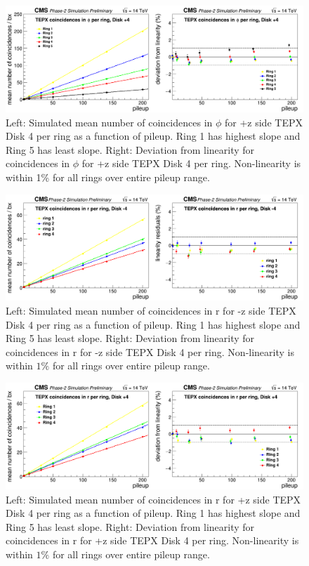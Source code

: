 \begin{figure}[H]
  \centering
  \includegraphics[width=1\columnwidth]{./coincidencesinphiperringD+4.png}
  \caption{Left: Simulated mean number of coincidences in $\phi$ for +z side TEPX Disk 4 per ring as a function of pileup. Ring 1 has highest slope and Ring 5 has least slope. Right: Deviation from linearity for coincidences in $\phi$ for +z side TEPX Disk 4 per ring. Non-linearity is within 1\% for all rings over entire pileup range.}
  \label{fig:CMS}
\end{figure}


\begin{figure}[H]
  \centering
  \includegraphics[width=1\columnwidth]{./coincidencesinrperringD-4.png}
  \caption{Left: Simulated mean number of coincidences in r for -z side TEPX Disk 4 per ring as a function of pileup. Ring 1 has highest slope and Ring 5 has least slope. Right: Deviation from linearity for coincidences in r for -z side TEPX Disk 4 per ring. Non-linearity is within $1\%$ for all rings over entire pileup range.}
  \label{fig:CMS}
\end{figure}


\begin{figure}[H]
  \centering
  \includegraphics[width=1\columnwidth]{./coincidencesinrperringD+4.png}
  \caption{Left: Simulated mean number of coincidences in r for +z side TEPX Disk 4 per ring as a function of pileup. Ring 1 has highest slope and Ring 5 has least slope. Right: Deviation from linearity for coincidences in r for +z side TEPX Disk 4 per ring. Non-linearity is within $1\%$ for all rings over entire pileup range.}
  \label{fig:CMS}
\end{figure}







